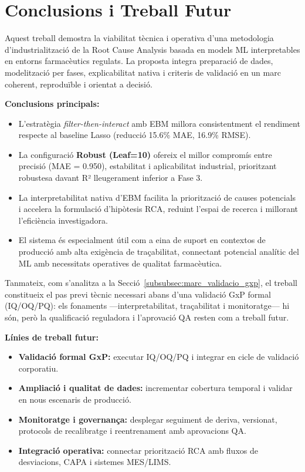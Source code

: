 \section{Conclusions i Treball Futur}

Aquest treball demostra la viabilitat tècnica i operativa d'una metodologia d'industrialització de la Root Cause Analysis basada en models ML interpretables en entorns farmacèutics regulats. La proposta integra preparació de dades, modelització per fases, explicabilitat nativa i criteris de validació en un marc coherent, reproduïble i orientat a decisió.

\textbf{Conclusions principals:}

\begin{itemize}
  \item L'estratègia \emph{filter-then-interact} amb EBM millora consistentment el rendiment respecte al baseline Lasso (reducció 15.6\% MAE, 16.9\% RMSE).
  \item La configuració \textbf{Robust (Leaf=10)} ofereix el millor compromís entre precisió (MAE = 0.950), estabilitat i aplicabilitat industrial, prioritzant robustesa davant R² lleugerament inferior a Fase 3.
  \item La interpretabilitat nativa d'EBM facilita la priorització de causes potencials i accelera la formulació d'hipòtesis RCA, reduint l'espai de recerca i millorant l'eficiència investigadora.
  \item El sistema és especialment útil com a eina de suport en contextos de producció amb alta exigència de traçabilitat, connectant potencial analític del ML amb necessitats operatives de qualitat farmacèutica.
\end{itemize}

Tanmateix, com s'analitza a la Secció~\ref{subsubsec:marc_validacio_gxp}, el treball constitueix el pas previ tècnic necessari abans d'una validació GxP formal (IQ/OQ/PQ): els fonaments —interpretabilitat, traçabilitat i monitoratge— hi són, però la qualificació reguladora i l'aprovació QA resten com a treball futur.

\textbf{Línies de treball futur:}

\begin{itemize}
  \item \textbf{Validació formal GxP:} executar IQ/OQ/PQ i integrar en cicle de validació corporatiu.
  \item \textbf{Ampliació i qualitat de dades:} incrementar cobertura temporal i validar en nous escenaris de producció.
  \item \textbf{Monitoratge i governança:} desplegar seguiment de deriva, versionat, protocols de recalibratge i reentrenament amb aprovacions QA.
  \item \textbf{Integració operativa:} connectar priorització RCA amb fluxos de desviacions, CAPA i sistemes MES/LIMS.
\end{itemize}

